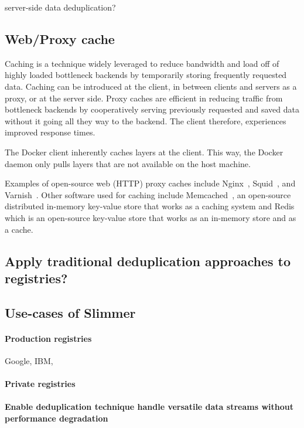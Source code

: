 server-side data deduplication?

\subsection{Web/Proxy cache}
Caching is a technique widely leveraged to reduce bandwidth and load off of highly loaded bottleneck backends by temporarily storing frequently requested data. 
Caching can be introduced at the client, in between clients and servers as a proxy, or at the server side. 
Proxy caches are efficient in reducing traffic from bottleneck backends by cooperatively serving previously requested and saved data without it going all they way to the backend. 
The client therefore, experiences improved response times.

The Docker client inherently caches layers at the client. This way, the Docker daemon only pulls layers that are not available on the host machine. 

Examples of open-source web (HTTP) proxy caches include Nginx~\cite{?}, Squid~\cite{?}, and Varnish~\cite{?}. Other software used for caching include Memcached~\cite{?}, an open-source distributed in-memory key-value store that works as a caching system and Redis~\cite{?} which is an open-source key-value store that works as an in-memory store and as a cache.



\subsection{Apply traditional deduplication approaches to registries?}



\subsection{Use-cases of Slimmer}

\paragraph{Production registries} Google, IBM,

\paragraph{Private registries}

\paragraph{Enable deduplication technique handle versatile data streams without performance degradation}

